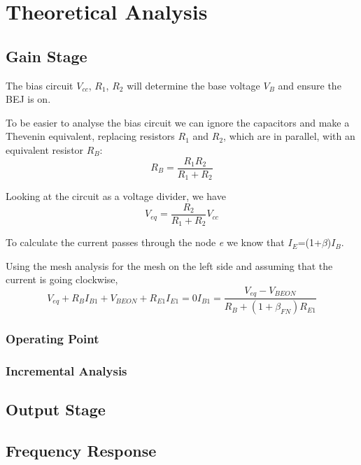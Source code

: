 \section{Theoretical Analysis} \label{sec:analysis}
 


\subsection{Gain Stage}
The bias circuit $V_{cc}$, $R_1$, $R_2$ will determine the base voltage $V_B$ and ensure the BEJ is on.

To be easier to analyse the bias circuit we can ignore the capacitors and make a Thevenin equivalent, replacing resistors $R_{1}$ and $R_{2}$, which are in parallel, with an equivalent resistor $R_{B}$:
\begin{equation}
R_B = \frac{R_{1} R_{2}}{R_{1}+R_{2}}
\end{equation}

Looking at the circuit as a voltage divider, we have
\begin{equation}
V_{eq} = \frac{R_{2}}{R_{1}+R_{2}} V_{cc}
\end{equation}

To calculate the current passes through the node \textit{e} we know that $I_E$=(1+$\beta$)$I_B$.

Using the mesh analysis for the mesh on the left side and assuming that the current is going clockwise,
\begin{equation}
V_{eq} + R_B I_{B1} + V_{BEON} + R_{E1} I_{E1} = 0
I_{B1} = \frac{V_{eq}-V_{BEON}}{R_B + (1+\beta_{FN}) R_{E1}}
\end{equation}


\subsubsection{Operating Point}
\subsubsection{Incremental Analysis}
\subsection{Output Stage}

\subsection{Frequency Response}




